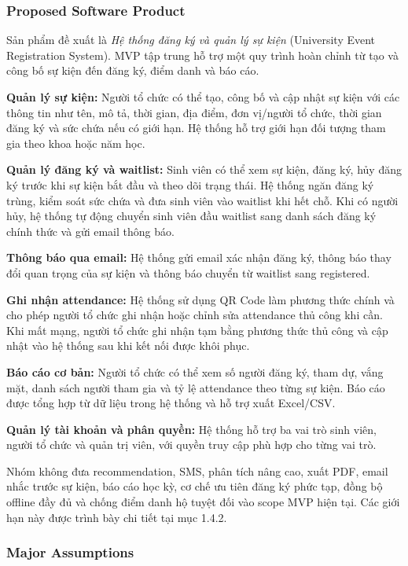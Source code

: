 \subsubsection{Proposed Software Product}

Sản phẩm đề xuất là \emph{Hệ thống đăng ký và quản lý sự kiện} (University Event Registration System). MVP tập trung hỗ trợ một quy trình hoàn chỉnh từ tạo và công bố sự kiện đến đăng ký, điểm danh và báo cáo.

\textbf{Quản lý sự kiện:} Người tổ chức có thể tạo, công bố và cập nhật sự kiện với các thông tin như tên, mô tả, thời gian, địa điểm, đơn vị/người tổ chức, thời gian đăng ký và sức chứa nếu có giới hạn. Hệ thống hỗ trợ giới hạn đối tượng tham gia theo khoa hoặc năm học.

\textbf{Quản lý đăng ký và waitlist:} Sinh viên có thể xem sự kiện, đăng ký, hủy đăng ký trước khi sự kiện bắt đầu và theo dõi trạng thái. Hệ thống ngăn đăng ký trùng, kiểm soát sức chứa và đưa sinh viên vào waitlist khi hết chỗ. Khi có người hủy, hệ thống tự động chuyển sinh viên đầu waitlist sang danh sách đăng ký chính thức và gửi email thông báo.

\textbf{Thông báo qua email:} Hệ thống gửi email xác nhận đăng ký, thông báo thay đổi quan trọng của sự kiện và thông báo chuyển từ waitlist sang registered.

\textbf{Ghi nhận attendance:} Hệ thống sử dụng QR Code làm phương thức chính và cho phép người tổ chức ghi nhận hoặc chỉnh sửa attendance thủ công khi cần. Khi mất mạng, người tổ chức ghi nhận tạm bằng phương thức thủ công và cập nhật vào hệ thống sau khi kết nối được khôi phục.

\textbf{Báo cáo cơ bản:} Người tổ chức có thể xem số người đăng ký, tham dự, vắng mặt, danh sách người tham gia và tỷ lệ attendance theo từng sự kiện. Báo cáo được tổng hợp từ dữ liệu trong hệ thống và hỗ trợ xuất Excel/CSV.

\textbf{Quản lý tài khoản và phân quyền:} Hệ thống hỗ trợ ba vai trò sinh viên, người tổ chức và quản trị viên, với quyền truy cập phù hợp cho từng vai trò.

Nhóm không đưa recommendation, SMS, phân tích nâng cao, xuất PDF, email nhắc trước sự kiện, báo cáo học kỳ, cơ chế ưu tiên đăng ký phức tạp, đồng bộ offline đầy đủ và chống điểm danh hộ tuyệt đối vào scope MVP hiện tại. Các giới hạn này được trình bày chi tiết tại mục 1.4.2.

\subsubsection{Major Assumptions}

